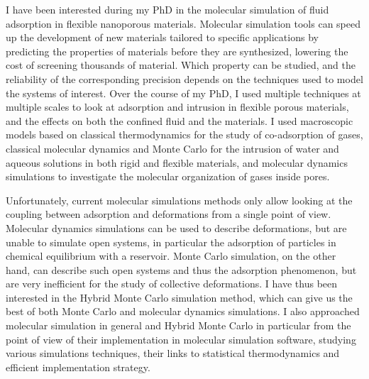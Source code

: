 I have been interested during my PhD in the molecular simulation of fluid
adsorption in flexible nanoporous materials. Molecular simulation tools can
speed up the development of new materials tailored to specific applications by
predicting the properties of materials before they are synthesized, lowering the
cost of screening thousands of material. Which property can be studied, and the
reliability of the corresponding precision depends on the techniques used to
model the systems of interest. Over the course of my PhD, I used multiple
techniques at multiple scales to look at adsorption and intrusion in flexible
porous materials, and the effects on both the confined fluid and the materials.
I used macroscopic models based on classical thermodynamics for the study of
co-adsorption of gases, classical molecular dynamics and Monte Carlo for the
intrusion of water and aqueous solutions in both rigid and flexible materials,
and \abinitio molecular dynamics simulations to investigate the molecular
organization of gases inside pores.

Unfortunately, current molecular simulations methods only allow looking at the
coupling between adsorption and deformations from a single point of view.
Molecular dynamics simulations can be used to describe deformations, but are
unable to simulate open systems, in particular the adsorption of particles in
chemical equilibrium with a reservoir. Monte Carlo simulation, on the other
hand, can describe such open systems and thus the adsorption phenomenon, but are
very inefficient for the study of collective deformations. I have thus been
interested in the Hybrid Monte Carlo simulation method, which can give us the
best of both Monte Carlo and molecular dynamics simulations. I also approached
molecular simulation in general and Hybrid Monte Carlo in particular from the
point of view of their implementation in molecular simulation software, studying
various simulations techniques, their links to statistical thermodynamics and
efficient implementation strategy.

\begin{center}
\end{center}

